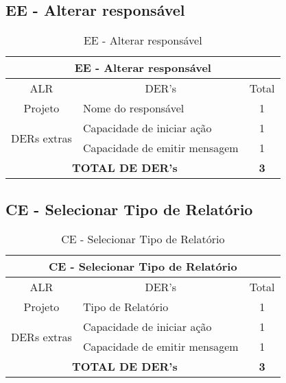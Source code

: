       
      
   \subsection{EE - Alterar responsável}
      
      \begin{table}[!h]
      \centering
      \caption{EE - Alterar responsável}
      \label{ee_alterar_responsavel}
      \begin{tabular}{|c|l|c|}
      \hline
      \multicolumn{3}{|c|}{EE - Alterar responsável}                              \\ \hline
      ALR                          & \multicolumn{1}{c|}{DER's}    & Total        \\ \hline
      Projeto                      & Nome do responsável           & 1            \\ \hline
      \multirow{2}{*}{DERs extras} & Capacidade de iniciar ação    & 1            \\ \cline{2-3} 
				  & Capacidade de emitir mensagem & 1            \\ \hline
       \multicolumn{2}{|c|}{\textbf{TOTAL DE DER's}}          & \textbf{3}         \\ \hline
      \end{tabular}
      \end{table}
      
	
   \subsection{CE - Selecionar Tipo de Relatório}
      
      \begin{table}[!h]
      \centering
      \caption{CE - Selecionar Tipo de Relatório}
      \label{ce_tipo_relatorio}
      \begin{tabular}{|c|l|c|}
      \hline
      \multicolumn{3}{|c|}{CE - Selecionar Tipo de Relatório}                              \\ \hline
      ALR                          & \multicolumn{1}{c|}{DER's}    & Total        \\ \hline
      Projeto                      & Tipo de Relatório             & 1            \\ \hline
      \multirow{2}{*}{DERs extras} & Capacidade de iniciar ação    & 1            \\ \cline{2-3} 
				  & Capacidade de emitir mensagem & 1            \\ \hline
       \multicolumn{2}{|c|}{\textbf{TOTAL DE DER's}}          & \textbf{3}         \\ \hline
      \end{tabular}
      \end{table}
      
